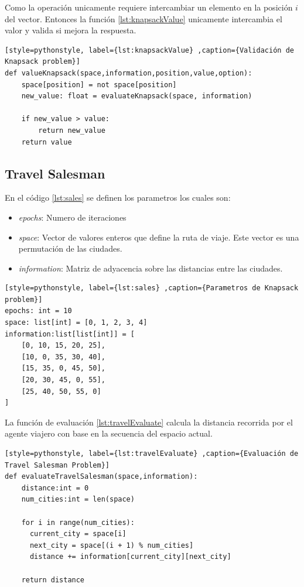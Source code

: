 \documentclass[12pt,twoside]{article}
\begin{document}
Como la operación   unicamente requiere intercambiar un elemento en la posición $i$ del vector. Entonces la función \ref{lst:knapsackValue} unicamente intercambia el valor y valida si mejora la respuesta. 

\begin{lstlisting}[style=pythonstyle, label={lst:knapsackValue} ,caption={Validación de Knapsack problem}]
def valueKnapsack(space,information,position,value,option):
	space[position] = not space[position]
	new_value: float = evaluateKnapsack(space, information)
	
	if new_value > value:
		return new_value
	return value
\end{lstlisting}

\clearpage
\subsection{Travel Salesman}

En el código \ref{lst:sales} se definen los parametros los cuales son:
\begin{itemize}
	\item \textit{epochs}: Numero de iteraciones
	\item \textit{space}: Vector de valores enteros que define la ruta de viaje. Este vector es una permutación de las ciudades.
	\item \textit{information}: Matriz de adyacencia sobre las distancias entre las ciudades.  
\end{itemize}

\begin{lstlisting}[style=pythonstyle, label={lst:sales} ,caption={Parametros de Knapsack problem}]
epochs: int = 10
space: list[int] = [0, 1, 2, 3, 4]
information:list[list[int]] = [
	[0, 10, 15, 20, 25],  
	[10, 0, 35, 30, 40],  
	[15, 35, 0, 45, 50],  
	[20, 30, 45, 0, 55],  
	[25, 40, 50, 55, 0] 
]
\end{lstlisting}

La función de evaluación \ref{lst:travelEvaluate} calcula la distancia recorrida por el agente viajero con base en la secuencia del espacio actual. 

\begin{lstlisting}[style=pythonstyle, label={lst:travelEvaluate} ,caption={Evaluación de Travel Salesman Problem}]
def evaluateTravelSalesman(space,information):
	distance:int = 0
	num_cities:int = len(space)
	
	for i in range(num_cities):
	  current_city = space[i]
	  next_city = space[(i + 1) % num_cities]  
	  distance += information[current_city][next_city]
	
	return distance
\end{lstlisting}
\end{document}
